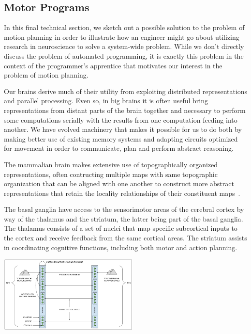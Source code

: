 
\subsection{Motor Programs}

In this final technical section, we sketch out a possible solution to the problem of motion planning in order to illustrate how an engineer might go about utilizing research in neuroscience to solve a system-wide problem. While we don't directly discuss the problem of automated programming, it is exactly this problem in the context of the programmer's apprentice that motivates our interest in the problem of motion planning.

Our brains derive much of their utility from exploiting distributed representations and parallel processing. Even so, in big brains it is often useful bring representations from distant parts of the brain together and necessary to perform some computations serially with the results from one computation feeding into another. We have evolved machinery that makes it possible for us to do both by making better use of existing memory systems and adapting circuits optimized for movement in order to communicate, plan and perform abstract reasoning.

The mammalian brain makes extensive use of topographically organized representations, often contructing multiple maps with same topographic organization that can be aligned with one another to construct more abstract representations that retain the locality relationships of their constituent maps~\cite{WandelletalNEURON-07,WandelletalPTRS-B-05}. 

The basal ganglia have access to the sensorimotor areas of the cerebral cortex by way of the thalamus and the striatum, the latter being part of the basal ganglia. The thalamus consists of a set of nuclei that map specific subcortical inputs to the cortex and receive feedback from the same cortical areas. The striatum assists in coordinating cognitive functions, including both motor and action planning.

\begin{center}
  \includegraphics[width=200pt]{./figures/Columns_Stripes_Clusters_Topographic_Maps.jpg}
\end{center}

